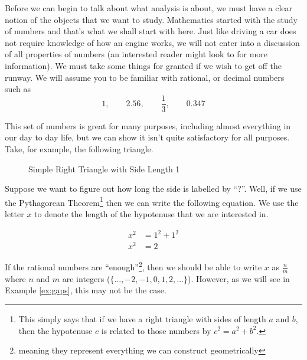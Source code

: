 
Before we can begin to talk about what analysis is about, we must have a clear
notion of the objects that we want to study. Mathematics started with the study
of numbers and that's what we shall start with here. Just like driving a car
does not require knowledge of how an engine works, we will not enter into a
discussion of all properties of numbers (an interested reader might look to
 for more information). We
must take some things for granted if we wish to get off the runway. We will
assume you to be familiar with rational, or decimal numbers such as
\begin{equation}\label{eq:numbers}
1, \qquad 2.56, \qquad \frac{1}{3}, \qquad 0.347
\end{equation}

This set of numbers is great for many purposes, including almost everything in
our day to day life, but we can show it isn't quite satisfactory for all
purposes. Take, for example, the following triangle.

\begin{figure}\label{fig:right-triangle}
    \centering
    \caption{Simple Right Triangle with Side Length 1}
\end{figure}

Suppose we want to figure out how long the side is labelled by ``?''. Well, if
we use the Pythagorean Theorem\footnote{This simply says that if we have a
right triangle with sides of length $a$ and $b$, then the hypotenuse $c$ is
related to those numbers by $c^2 = a^2 + b^2$.} then we can write the following
equation. We use the letter $x$ to denote the length of the hypotenuse that we
are interested in. 

\begin{align}
    x^2 & = 1^2 + 1^2 \nonumber \\
    x^2 & = 2 \label{eq:sqrt2}
\end{align}

If the rational numbers are ``enough''\footnote{meaning they represent
everything we can construct geometrically}, then we should be able to write $x$
as $\frac{n}{m}$ where $n$ and $m$ are integers ({$\{\ldots, -2, -1,
0, 1, 2, \ldots\}$}).
However, as we will see in Example \ref{ex:gaps}, this may not be the case.

